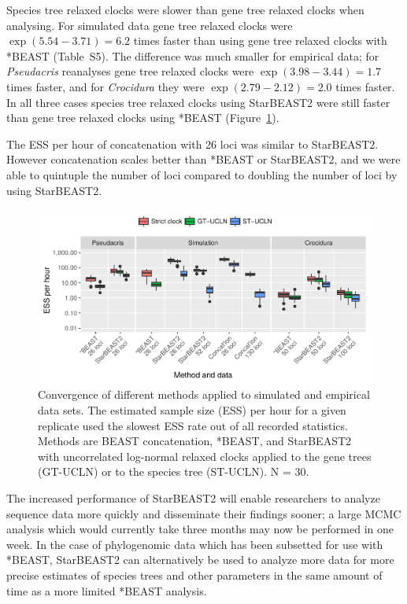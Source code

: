 \documentclass[12pt]{article}
\begin{document}
Species tree relaxed clocks were slower than gene tree relaxed clocks when
analysing. For simulated data gene tree relaxed clocks were $\exp(5.54 - 3.71)
= 6.2$ times faster than using gene tree relaxed clocks with *BEAST
(Table~S5). The difference was much smaller for empirical data; for
\textit{Pseudacris} reanalyses gene tree relaxed clocks were $\exp(3.98 -
3.44) = 1.7$ times faster, and for \textit{Crocidura} they were $\exp(2.79 -
2.12) = 2.0$ times faster. In all three cases species tree relaxed clocks
using StarBEAST2 were still faster than gene tree relaxed clocks using *BEAST
(Figure~\ref{fig:essPerHourComparison}).

The ESS per hour of concatenation with 26 loci was similar to StarBEAST2.
However concatenation scales better than *BEAST or StarBEAST2, and we were
able to quintuple the number of loci compared to doubling the number of loci
by using StarBEAST2.

\begin{figure}[htb!]
\centering
\includegraphics[width=\textwidth]{minimum_ess_per_hour_comparison.pdf}
\caption
{Convergence of different methods applied to simulated and empirical data
sets. The estimated sample size (ESS) per hour for a given replicate used the
slowest ESS rate out of all recorded statistics. Methods are BEAST
concatenation, *BEAST, and StarBEAST2 with uncorrelated log-normal relaxed
clocks applied to the gene trees (GT-UCLN) or to the species tree (ST-UCLN).
N = 30.}
\label{fig:essPerHourComparison}
\end{figure}

The increased performance of StarBEAST2 will enable researchers to analyze
sequence data more quickly and disseminate their findings sooner; a large MCMC
analysis which would currently take three months may now be performed in one
week. In the case of phylogenomic data which has been subsetted for use with
*BEAST, StarBEAST2 can alternatively be used to analyze more data for more
precise estimates of species trees and other parameters in the same amount of
time as a more limited *BEAST analysis.
\end{document}
